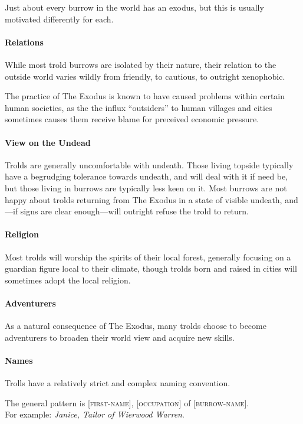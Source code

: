 Just about every burrow in the world has an exodus, but this is usually motivated differently for each.

\paragraph{Relations}
While most trold burrows are isolated by their nature, their relation to the outside world varies wildly from friendly, to cautious, to outright xenophobic.

The practice of The Exodus is known to have caused problems within certain human societies, as the the influx ``outsiders'' to human villages and cities sometimes causes them receive blame for preceived economic pressure.

\paragraph{View on the Undead}
Trolds are generally uncomfortable with undeath.
Those living topside typically have a begrudging tolerance towards undeath, and will deal with it if need be, but those living in burrows are typically less keen on it.
Most burrows are not happy about trolds returning from The Exodus in a state of visible undeath, and---if signs are clear enough---will outright refuse the trold to return.

\paragraph{Religion}
Most trolds will worship the spirits of their local forest, generally focusing on a guardian figure local to their climate, though trolds born and raised in cities will sometimes adopt the local religion.

\paragraph{Adventurers}
As a natural consequence of The Exodus, many trolds choose to become adventurers to broaden their world view and acquire new skills.

\paragraph{Names}
Trolls have a relatively strict and complex naming convention.

The general pattern is \textsc{[first-name]}, \textsc{[occupation]} of \textsc{[burrow-name]}. \\For example: \textit{Janice, Tailor of Wierwood Warren}.

